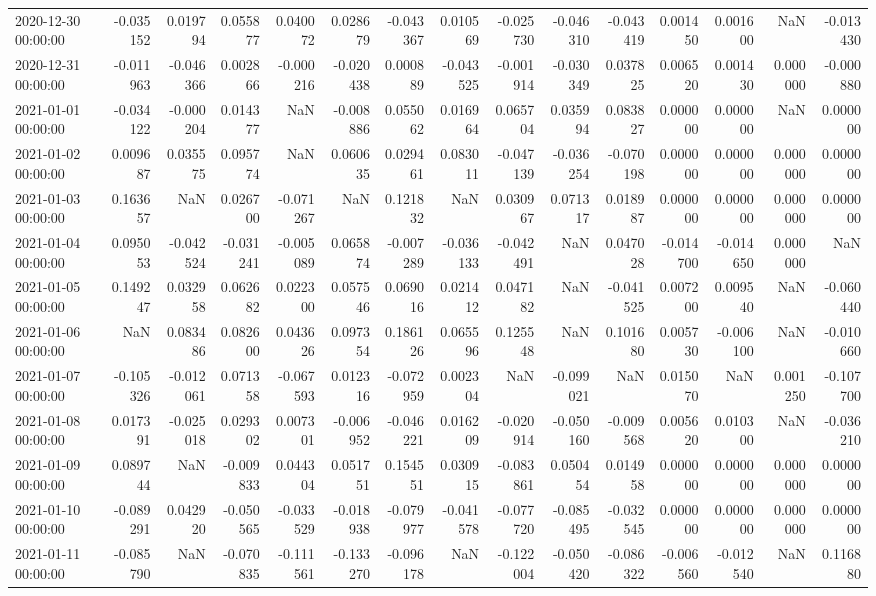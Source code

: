 \begin{tabular}{lrrrrrrrrrrrrrr}
2020-12-30 00:00:00 & -0.035152 & 0.019794 & 0.055877 & 0.040072 & 0.028679 & -0.043367 & 0.010569 & -0.025730 & -0.046310 & -0.043419 & 0.001450 & 0.001600 & NaN & -0.013430 \\
2020-12-31 00:00:00 & -0.011963 & -0.046366 & 0.002866 & -0.000216 & -0.020438 & 0.000889 & -0.043525 & -0.001914 & -0.030349 & 0.037825 & 0.006520 & 0.001430 & 0.000000 & -0.000880 \\
2021-01-01 00:00:00 & -0.034122 & -0.000204 & 0.014377 & NaN & -0.008886 & 0.055062 & 0.016964 & 0.065704 & 0.035994 & 0.083827 & 0.000000 & 0.000000 & NaN & 0.000000 \\
2021-01-02 00:00:00 & 0.009687 & 0.035575 & 0.095774 & NaN & 0.060635 & 0.029461 & 0.083011 & -0.047139 & -0.036254 & -0.070198 & 0.000000 & 0.000000 & 0.000000 & 0.000000 \\
2021-01-03 00:00:00 & 0.163657 & NaN & 0.026700 & -0.071267 & NaN & 0.121832 & NaN & 0.030967 & 0.071317 & 0.018987 & 0.000000 & 0.000000 & 0.000000 & 0.000000 \\
2021-01-04 00:00:00 & 0.095053 & -0.042524 & -0.031241 & -0.005089 & 0.065874 & -0.007289 & -0.036133 & -0.042491 & NaN & 0.047028 & -0.014700 & -0.014650 & 0.000000 & NaN \\
2021-01-05 00:00:00 & 0.149247 & 0.032958 & 0.062682 & 0.022300 & 0.057546 & 0.069016 & 0.021412 & 0.047182 & NaN & -0.041525 & 0.007200 & 0.009540 & NaN & -0.060440 \\
2021-01-06 00:00:00 & NaN & 0.083486 & 0.082600 & 0.043626 & 0.097354 & 0.186126 & 0.065596 & 0.125548 & NaN & 0.101680 & 0.005730 & -0.006100 & NaN & -0.010660 \\
2021-01-07 00:00:00 & -0.105326 & -0.012061 & 0.071358 & -0.067593 & 0.012316 & -0.072959 & 0.002304 & NaN & -0.099021 & NaN & 0.015070 & NaN & 0.001250 & -0.107700 \\
2021-01-08 00:00:00 & 0.017391 & -0.025018 & 0.029302 & 0.007301 & -0.006952 & -0.046221 & 0.016209 & -0.020914 & -0.050160 & -0.009568 & 0.005620 & 0.010300 & NaN & -0.036210 \\
2021-01-09 00:00:00 & 0.089744 & NaN & -0.009833 & 0.044304 & 0.051751 & 0.154551 & 0.030915 & -0.083861 & 0.050454 & 0.014958 & 0.000000 & 0.000000 & 0.000000 & 0.000000 \\
2021-01-10 00:00:00 & -0.089291 & 0.042920 & -0.050565 & -0.033529 & -0.018938 & -0.079977 & -0.041578 & -0.077720 & -0.085495 & -0.032545 & 0.000000 & 0.000000 & 0.000000 & 0.000000 \\
2021-01-11 00:00:00 & -0.085790 & NaN & -0.070835 & -0.111561 & -0.133270 & -0.096178 & NaN & -0.122004 & -0.050420 & -0.086322 & -0.006560 & -0.012540 & NaN & 0.116880 \\

\end{tabular}
